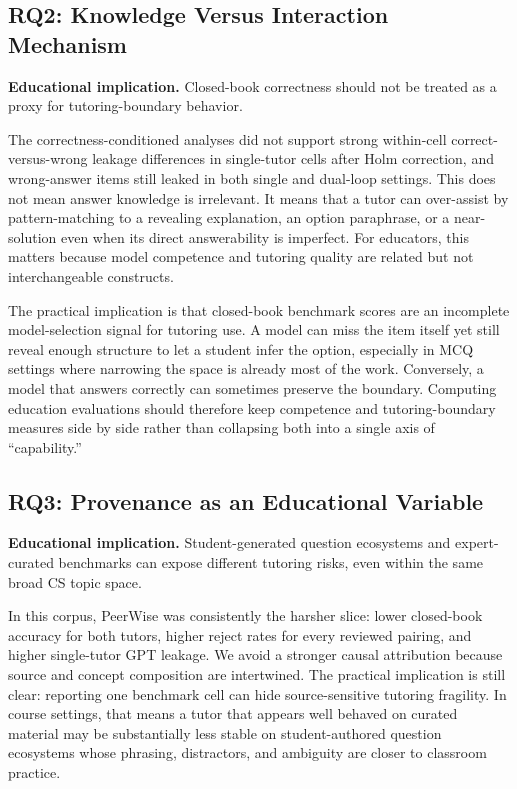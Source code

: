 \documentclass[manuscript,review,anonymous]{acmart}
\begin{document}
\subsection{RQ2: Knowledge Versus Interaction Mechanism}

\textbf{Educational implication.} Closed-book correctness should not be treated as a proxy for tutoring-boundary behavior.

The correctness-conditioned analyses did not support strong within-cell correct-versus-wrong leakage differences in single-tutor cells after Holm correction, and wrong-answer items still leaked in both single and dual-loop settings. This does not mean answer knowledge is irrelevant. It means that a tutor can over-assist by pattern-matching to a revealing explanation, an option paraphrase, or a near-solution even when its direct answerability is imperfect. For educators, this matters because model competence and tutoring quality are related but not interchangeable constructs.

The practical implication is that closed-book benchmark scores are an incomplete model-selection signal for tutoring use. A model can miss the item itself yet still reveal enough structure to let a student infer the option, especially in MCQ settings where narrowing the space is already most of the work. Conversely, a model that answers correctly can sometimes preserve the boundary. Computing education evaluations should therefore keep competence and tutoring-boundary measures side by side rather than collapsing both into a single axis of ``capability.''

\subsection{RQ3: Provenance as an Educational Variable}

\textbf{Educational implication.} Student-generated question ecosystems and expert-curated benchmarks can expose different tutoring risks, even within the same broad CS topic space.

In this corpus, PeerWise was consistently the harsher slice: lower closed-book accuracy for both tutors, higher reject rates for every reviewed pairing, and higher single-tutor GPT leakage. We avoid a stronger causal attribution because source and concept composition are intertwined. The practical implication is still clear: reporting one benchmark cell can hide source-sensitive tutoring fragility. In course settings, that means a tutor that appears well behaved on curated material may be substantially less stable on student-authored question ecosystems whose phrasing, distractors, and ambiguity are closer to classroom practice.
\end{document}
